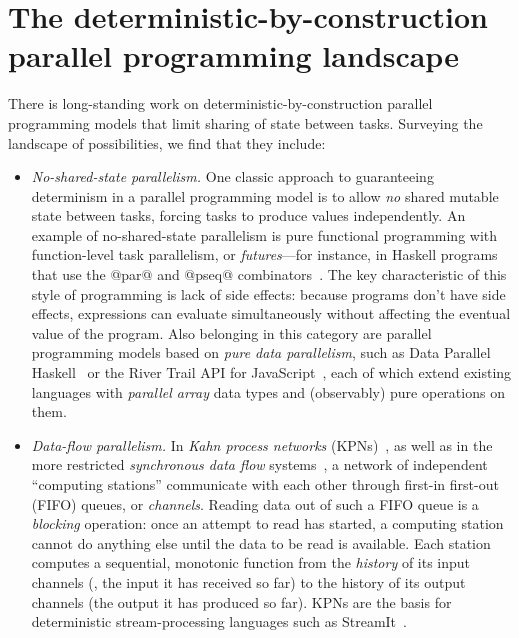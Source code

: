 \section{The deterministic-by-construction parallel programming landscape}\label{s:intro-landscape}

There is long-standing work on deterministic-by-construction parallel
programming models that limit sharing of state between
tasks. Surveying the landscape of possibilities, we find that they
include:

\begin{itemize}
\item \emph{No-shared-state parallelism.}  One classic
  approach to guaranteeing determinism in a parallel programming model
  is to allow \emph{no} shared mutable state between tasks, forcing
  tasks to produce values independently.  An example of
  no-shared-state parallelism is pure functional programming with
  function-level task parallelism, or \emph{futures}---for instance,
  in Haskell programs that use the @par@ and @pseq@
  combinators~\cite{marlow-par}.  The key characteristic of this style
  of programming is lack of side effects: because programs don't have
  side effects, expressions can evaluate simultaneously without
  affecting the eventual value of the program.  Also belonging in this
  category are parallel programming models based on \emph{pure data
    parallelism}, such as Data Parallel Haskell~\cite{dph, dph-status}
  or the River Trail API for JavaScript~\cite{river-trail}, each of
  which extend existing languages with \emph{parallel array} data
  types and (observably) pure operations on them.

\item \emph{Data-flow parallelism.}  In
  \emph{Kahn process networks} (KPNs)~\cite{Kahn-1974}, as well as in
  the more restricted \emph{synchronous data flow}
  systems~\cite{Lee-sdn}, a network of independent ``computing
  stations'' communicate with each other through first-in first-out
  (FIFO) queues, or \emph{channels}.  Reading data out of such a FIFO
  queue is a \emph{blocking} operation: once an attempt to read has
  started, a computing station cannot do anything else until the data
  to be read is available.  Each station computes a sequential,
  monotonic function from the \emph{history} of its input channels
  (\ie, the input it has received so far) to the history of its output
  channels (the output it has produced so far).  KPNs are the basis
  for deterministic stream-processing languages such as
  StreamIt~\cite{streamit-asplos}.


\end{itemize}

